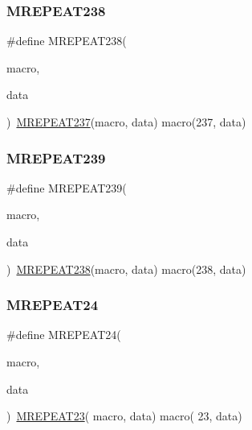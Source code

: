 \mbox{\label{group__group__sam0__utils__mrepeat_ga22a583e1c58865d54827789830f38953}} 
\subsubsection{\texorpdfstring{MREPEAT238}{MREPEAT238}}
{\footnotesize\ttfamily \#define M\+R\+E\+P\+E\+A\+T238(\begin{DoxyParamCaption}\item[{}]{macro,  }\item[{}]{data }\end{DoxyParamCaption})~\mbox{\hyperlink{group__group__sam0__utils__mrepeat_ga0e49a6a0b3047b2d3ec37912f6f15c7a}{M\+R\+E\+P\+E\+A\+T237}}(macro, data)   macro(237, data)}

\mbox{\label{group__group__sam0__utils__mrepeat_gac7ec468a3f485459ffcac683dd035e65}} 
\subsubsection{\texorpdfstring{MREPEAT239}{MREPEAT239}}
{\footnotesize\ttfamily \#define M\+R\+E\+P\+E\+A\+T239(\begin{DoxyParamCaption}\item[{}]{macro,  }\item[{}]{data }\end{DoxyParamCaption})~\mbox{\hyperlink{group__group__sam0__utils__mrepeat_ga22a583e1c58865d54827789830f38953}{M\+R\+E\+P\+E\+A\+T238}}(macro, data)   macro(238, data)}

\mbox{\label{group__group__sam0__utils__mrepeat_gaa40f282e37901ebbaac8b42af65e02fb}} 
\subsubsection{\texorpdfstring{MREPEAT24}{MREPEAT24}}
{\footnotesize\ttfamily \#define M\+R\+E\+P\+E\+A\+T24(\begin{DoxyParamCaption}\item[{}]{macro,  }\item[{}]{data }\end{DoxyParamCaption})~\mbox{\hyperlink{group__group__sam0__utils__mrepeat_gadd71c28e883bbbf5f033d518e35b230d}{M\+R\+E\+P\+E\+A\+T23}}( macro, data)   macro( 23, data)}

